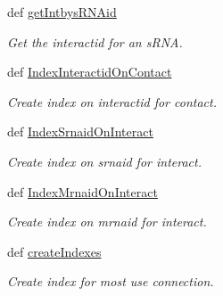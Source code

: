 \begin{DoxyCompactItemize}
def \hyperlink{classirna_1_1iRNA__pred_1_1Sqlite__manager_1_1Sqlite__manager_a0261a3823fdbe0c3aa86106260ea77d5}{get\-Intbys\-R\-N\-Aid}
\begin{DoxyCompactList}\small\item\em \-Get the interactid for an s\-R\-N\-A. \end{DoxyCompactList}\item 
def \hyperlink{classirna_1_1iRNA__pred_1_1Sqlite__manager_1_1Sqlite__manager_a7406ef84f08d71df5e7ff47297512f0b}{\-Index\-Interactid\-On\-Contact}
\begin{DoxyCompactList}\small\item\em \-Create index on interactid for contact. \end{DoxyCompactList}\item 
def \hyperlink{classirna_1_1iRNA__pred_1_1Sqlite__manager_1_1Sqlite__manager_a3c1414f56c3477f5473a82db551160f9}{\-Index\-Srnaid\-On\-Interact}
\begin{DoxyCompactList}\small\item\em \-Create index on srnaid for interact. \end{DoxyCompactList}\item 
def \hyperlink{classirna_1_1iRNA__pred_1_1Sqlite__manager_1_1Sqlite__manager_a248263f42ffb07448b67cfdf62f7a769}{\-Index\-Mrnaid\-On\-Interact}
\begin{DoxyCompactList}\small\item\em \-Create index on mrnaid for interact. \end{DoxyCompactList}\item 
def \hyperlink{classirna_1_1iRNA__pred_1_1Sqlite__manager_1_1Sqlite__manager_aaf8ac726c0412ccf835a933e1c1b0651}{create\-Indexes}
\begin{DoxyCompactList}\small\item\em \-Create index for most use connection. \end{DoxyCompactList}\end{DoxyCompactItemize}
